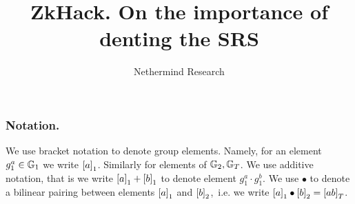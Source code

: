 \documentclass[runningheads,11pt,a4paper]{llncs}
\title{ZkHack. On the importance of denting the SRS}
\author{Nethermind Research}
\institute{}
\begin{document}
\sloppy
\maketitle

\subsubsection*{Notation.}
We use bracket notation to denote group elements. Namely, for an element $g_1^{a} \in \mathbb{G}_1$ we write $\left[a\right]_{1}$. Similarly for elements of $\mathbb{G}_2, \mathbb{G}_T$. We use additive notation, that is we write $\left[a\right]_{1} + \left[b\right]_{1}$ to denote element $g_1^{a} \cdot g_1^{b}$. We use $\bullet$ to denote a bilinear pairing between elements $\left[a\right]_{1}$ and $\left[b\right]_{2}$,~i.e. we write $\left[a\right]_{1} \bullet \left[b\right]_{2} = \left[ab\right]_{T}$.

\newcommand{\ck}{\pcalgostyle{ck}}
\renewcommand{\com}{\pcalgostyle{Commit}}
\renewcommand{\open}{\pcalgostyle{Open}}
\renewcommand{\verify}{\pcalgostyle{Verify}}
\end{document}
